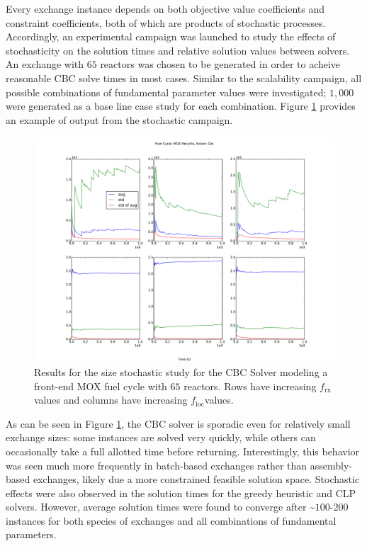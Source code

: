 \documentclass{anstrans}
\newcommand{\frx}{$f_{\text{rx}}$}
\newcommand{\floc}{$f_{\text{loc}}$}
\begin{document}
Every exchange instance depends on both objective value coefficients and
constraint coefficients, both of which are products of stochastic
processes. Accordingly, an experimental campaign was launched to study the
effects of stochasticity on the solution times and relative solution values
between solvers. An exchange with $65$ reactors was chosen to be generated in
order to acheive reasonable CBC solve times in most cases. Similar to the
scalability campaign, all possible combinations of fundamental parameter values
were investigated; $1,000$ were generated as a base line case study for each
combination. Figure \ref{fig:cbc_stochastic} provides an example of output from
the stochastic campaign.

\begin{figure}
  \begin{center}
    \includegraphics[width=1.5\columnwidth]{1k_avg_front_time_fc1_solvercbc.pdf}
    \caption[]{
      \label{fig:cbc_stochastic}
      Results for the size stochastic study for the CBC Solver modeling a
      front-end MOX fuel cycle with $65$ reactors. Rows have increasing \frx
      values and columns have increasing \floc values.  }
  \end{center}
\end{figure}

As can be seen in Figure \ref{fig:cbc_stochastic}, the CBC solver is sporadic
even for relatively small exchange sizes: some instances are solved very
quickly, while others can occasionally take a full allotted time before
returning. Interestingly, this behavior was seen much more frequently in
batch-based exchanges rather than assembly-based exchanges, likely due a more
constrained feasible solution space. Stochastic effects were also observed in
the solution times for the greedy heuristic and CLP solvers. However, average
solution times were found to converge after \textasciitilde$100$-$200$ instances
for both species of exchanges and all combinations of fundamental parameters.
\end{document}
